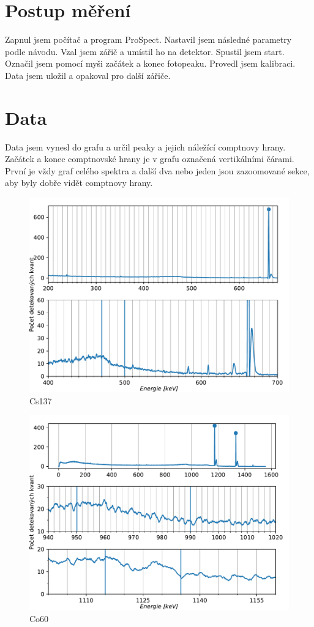\documentclass{article}
\begin{document}
\section{Postup měření}
Zapnul jsem počítač a program ProSpect.
Nastavil jsem následné parametry podle návodu.
Vzal jsem zářič a umístil ho na detektor.
Spustil jsem start.
Označil jsem pomocí myši začátek a konec fotopeaku.
Provedl jsem kalibraci.
Data jsem uložil a opakoval pro další zářiče.
\newpage
\section{Data}
Data jsem vynesl do grafu a určil peaky a jejich náležící comptnovy hrany.
Začátek a konec comptnovské hrany je v grafu označená vertikálními čárami.
První je vždy graf celého spektra a další dva nebo jeden jsou zazoomované sekce,
aby byly dobře vidět comptnovy hrany.
\begin{figure}[!h]
  \hspace*{-1em}
  \includegraphics[scale=0.8]{figs/Cs137.pdf}
  \caption{Cs137}
\end{figure}
\newpage
\begin{figure}[!h]
  \hspace*{-1em}
  \includegraphics[scale=0.8]{figs/Co60.pdf}
  \caption{Co60}
\end{figure}
\end{document}
